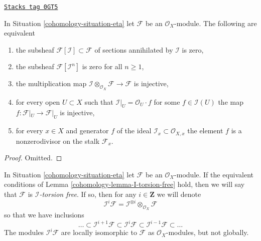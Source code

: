 \begin{lemma}
\label{cohomology-lemma-I-torsion-free}
\href{https://stacks.math.columbia.edu/tag/0GT5}{\texttt{Stacks tag 0GT5}}

In Situation \ref{cohomology-situation-eta}
let $\mathcal{F}$ be an $\mathcal{O}_X$-module.
The following are equivalent
\begin{enumerate}
\item the subsheaf $\mathcal{F}[\mathcal{I}] \subset \mathcal{F}$
of sections annihilated by $\mathcal{I}$ is zero,
\item the subsheaf $\mathcal{F}[\mathcal{I}^n]$ is zero for all $n \geq 1$,
\item the multiplication map
$\mathcal{I} \otimes_{\mathcal{O}_X} \mathcal{F} \to \mathcal{F}$
is injective,
\item for every open $U \subset X$ such that
$\mathcal{I}|_U = \mathcal{O}_U \cdot f$
for some $f \in \mathcal{I}(U)$
the map $f : \mathcal{F}|_U \to \mathcal{F}|_U$ is injective,
\item for every $x \in X$ and generator $f$ of the ideal
$\mathcal{I}_x \subset \mathcal{O}_{X, x}$ the element $f$
is a nonzerodivisor on the stalk $\mathcal{F}_x$.
\end{enumerate}
\end{lemma}

\begin{proof}
Omitted.
\end{proof}

In Situation \ref{cohomology-situation-eta}
let $\mathcal{F}$ be an $\mathcal{O}_X$-module.
If the equivalent conditions of Lemma \ref{cohomology-lemma-I-torsion-free} hold,
then we will say that $\mathcal{F}$ is {\it $\mathcal{I}$-torsion free}.
If so, then for any $i \in \mathbf{Z}$ we will denote
$$
\mathcal{I}^i\mathcal{F} =
\mathcal{I}^{\otimes i} \otimes_{\mathcal{O}_X} \mathcal{F}
$$
so that we have inclusions
$$
\ldots \subset
\mathcal{I}^{i + 1}\mathcal{F} \subset
\mathcal{I}^i\mathcal{F} \subset
\mathcal{I}^{i - 1}\mathcal{F} \subset \ldots
$$
The modules $\mathcal{I}^i\mathcal{F}$ are locally isomorphic to
$\mathcal{F}$ as $\mathcal{O}_X$-modules, but not globally.

